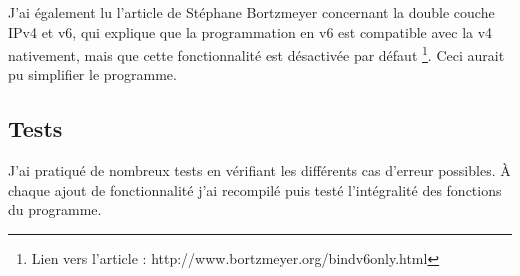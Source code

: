 J'ai également lu l'article de Stéphane Bortzmeyer \cite{BORTZMEYER} 
concernant la double couche IPv4 et v6, 
qui explique que la programmation en v6 est compatible avec la v4 nativement, 
mais que cette fonctionnalité est désactivée par défaut
\protect\footnote{ Lien vers l'article : http://www.bortzmeyer.org/bindv6only.html }.
Ceci aurait pu simplifier le programme.

\subsection{Tests}

J'ai pratiqué de nombreux tests en vérifiant les différents cas d'erreur possibles.
À chaque ajout de fonctionnalité j'ai recompilé puis testé 
l'intégralité des fonctions du programme.

